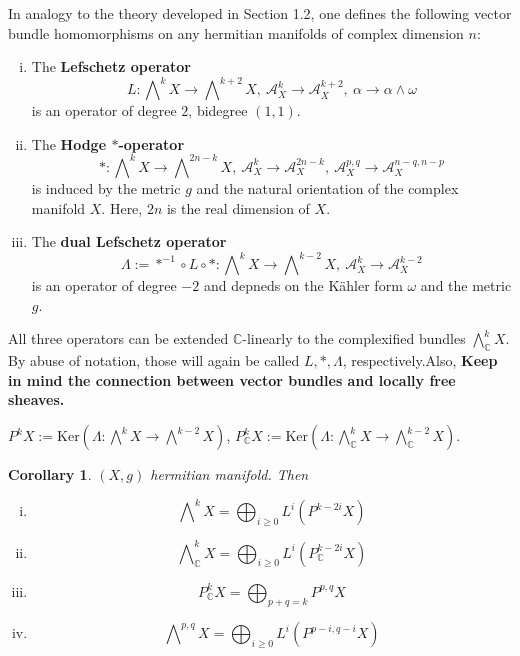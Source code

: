 \documentclass{article}
\theoremstyle{definition}
\theoremstyle{plain}
\newtheorem{corollary}[definition]{Corollary}
\begin{document}
In analogy to the theory developed in Section 1.2, one defines the following vector bundle homomorphisms on any hermitian manifolds of complex dimension $ n $:
\begin{enumerate}[(i)]
    \item The \textbf{Lefschetz operator}\[
        L:\bigwedge\nolimits^k X\rightarrow \bigwedge\nolimits^{k+2}X,\ \mathcal{A}^{k}_X\rightarrow\mathcal{A}^{k+2}_X,\ \alpha\rightarrow\alpha\wedge\omega
    \]is an operator of degree $ 2 $, bidegree $ (1,1) $.
    \item The \textbf{Hodge $ * $-operator}\[
        *:\bigwedge\nolimits^k X\rightarrow \bigwedge\nolimits^{2n-k}X,\ \mathcal{A}^k_X\rightarrow\mathcal{A}^{2n-k}_X,\ \mathcal{A}^{p,q}_X\rightarrow\mathcal{A}^{n-q,n-p}_X
    \]is induced by the metric $ g $ and the natural orientation of the complex manifold $ X $. Here, $ 2n $ is the real dimension of $ X $.
    \item The \textbf{dual Lefschetz operator}\[
        \varLambda:=*^{-1}\circ L\circ *:\bigwedge\nolimits^k X\rightarrow\bigwedge\nolimits^{k-2}X,\ \mathcal{A}^k_X\rightarrow\mathcal{A}^{k-2}_X
    \]is an operator of degree $ -2 $ and depneds on the K\"{a}hler form $ \omega $ and the metric $ g $.
\end{enumerate}

All three operators can be extended $ \mathbb{C} $-linearly to the complexified bundles $ \bigwedge^k_{\mathbb{C}}X $. By abuse of notation, those will again be called $ L,*,\varLambda $, respectively.Also, \textbf{Keep in mind the connection between vector bundles and locally free sheaves.}

$ P^{k}X:=\mathrm{Ker}(\varLambda:\bigwedge^{k}X\rightarrow\bigwedge^{k-2}X) $, $ P^k_{\mathbb{C}}X:=\mathrm{Ker}(\varLambda:\bigwedge^{k}_{\mathbb{C}}X\rightarrow\bigwedge^{k-2}_{\mathbb{C}}X) $.

\begin{corollary}
    $ (X,g) $ hermitian manifold. Then\begin{enumerate}[(i)]
            \item \[
                \bigwedge\nolimits^k X=\bigoplus_{i\geqslant 0} L^i(P^{k-2i}X)
            \]
            \item \[
                \bigwedge\nolimits^k_{\mathbb{C}} X=\bigoplus_{i\geqslant 0}L^i(P^{k-2i}_{\mathbb{C}}X)
            \]
            \item \[
                P^k_{\mathbb{C}}X=\bigoplus_{p+q=k}P^{p,q}X
            \]
            \item \[
                \bigwedge\nolimits^{p,q}X=\bigoplus_{i\geqslant 0}L^i(P^{p-i,q-i}X)
            \]
        \end{enumerate}
\end{corollary}
\end{document}
